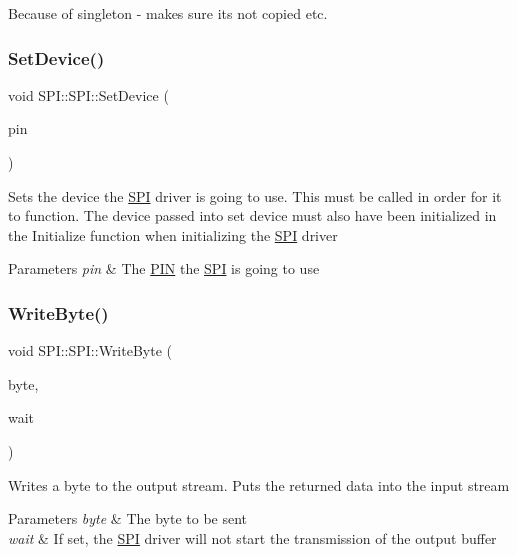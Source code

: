 Because of singleton -\/ makes sure its not copied etc. \hypertarget{class_s_p_i_1_1_s_p_i_a4c48f641a89d5b72428979f39c9fa96f}{}\label{class_s_p_i_1_1_s_p_i_a4c48f641a89d5b72428979f39c9fa96f} 
\subsubsection{\texorpdfstring{Set\+Device()}{SetDevice()}}
{\footnotesize\ttfamily void S\+P\+I\+::\+S\+P\+I\+::\+Set\+Device (\begin{DoxyParamCaption}\item[{\hyperlink{struct_s_p_i_1_1_p_i_n}{P\+IN}}]{pin }\end{DoxyParamCaption})}

Sets the device the \hyperlink{class_s_p_i_1_1_s_p_i}{S\+PI} driver is going to use. This must be called in order for it to function. The device passed into set device must also have been initialized in the Initialize function when initializing the \hyperlink{class_s_p_i_1_1_s_p_i}{S\+PI} driver 
\begin{DoxyParams}{Parameters}
{\em pin} & The \hyperlink{struct_s_p_i_1_1_p_i_n}{P\+IN} the \hyperlink{class_s_p_i_1_1_s_p_i}{S\+PI} is going to use \\
\hline
\end{DoxyParams}
\hypertarget{class_s_p_i_1_1_s_p_i_a29a9a80b0e7a32f25b7571205344a84d}{}\label{class_s_p_i_1_1_s_p_i_a29a9a80b0e7a32f25b7571205344a84d} 
\subsubsection{\texorpdfstring{Write\+Byte()}{WriteByte()}}
{\footnotesize\ttfamily void S\+P\+I\+::\+S\+P\+I\+::\+Write\+Byte (\begin{DoxyParamCaption}\item[{uint8\+\_\+t}]{byte,  }\item[{bool}]{wait }\end{DoxyParamCaption})}

Writes a byte to the output stream. Puts the returned data into the input stream 
\begin{DoxyParams}{Parameters}
{\em byte} & The byte to be sent \\
\hline
{\em wait} & If set, the \hyperlink{class_s_p_i_1_1_s_p_i}{S\+PI} driver will not start the transmission of the output buffer \\
\hline
\end{DoxyParams}
\hypertarget{class_s_p_i_1_1_s_p_i_a2cd0f0612198d4e6a793ce794c016b9d}{}\label{class_s_p_i_1_1_s_p_i_a2cd0f0612198d4e6a793ce794c016b9d} 
